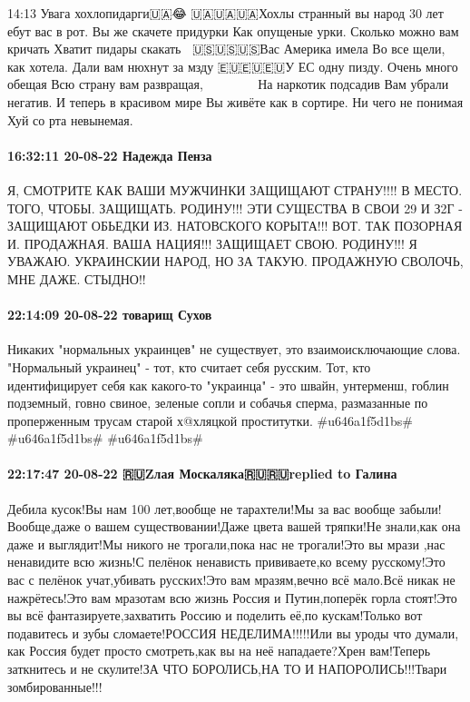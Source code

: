 14:13
Увага хохлопидарги🇺🇦😂
🇺🇦🇺🇦🇺🇦Хохлы странный вы народ
30 лет ебут вас в рот.
Вы же скачете придурки
Как опущеные урки.
Сколько можно вам кричать
Хватит пидары скакать🏳‍🌈
🇺🇸🇺🇸🇺🇸Вас Америка имела
Во все щели, как хотела.
Дали вам нюхнут за мзду
🇪🇺🇪🇺🇪🇺У ЕС одну пизду.
Очень много обещая
Всю страну вам развращая, 🏳‍🌈🇺🇦🏳‍🌈🇺🇦🇺🇸🏳‍🌈😂
На наркотик подсадив
Вам убрали негатив.
И теперь в красивом мире
Вы живёте как в сортире.
Ни чего не понимая
Хуй со рта невынемая.
🏳‍🌈🇺🇦🇺🇸🏳‍🌈🇺🇦🏳‍🌈🇺🇸😂😂😂

\paragraph{16:32:11 20-08-22 Надежда Пенза}

Я, СМОТРИТЕ КАК ВАШИ МУЖЧИНКИ ЗАЩИЩАЮТ СТРАНУ!!!!
В МЕСТО. ТОГО, ЧТОБЫ. ЗАЩИЩАТЬ. РОДИНУ!!!
ЭТИ СУЩЕСТВА В СВОИ 29 И З2Г - ЗАЩИЩАЮТ ОБЬЕДКИ
ИЗ. НАТОВСКОГО КОРЫТА!!!
ВОТ. ТАК ПОЗОРНАЯ И. ПРОДАЖНАЯ. ВАША НАЦИЯ!!!
ЗАЩИЩАЕТ СВОЮ. РОДИНУ!!!
Я УВАЖАЮ. УКРАИНСКИИ НАРОД, НО ЗА ТАКУЮ. ПРОДАЖНУЮ СВОЛОЧЬ, МНЕ ДАЖЕ. СТЫДНО!!

\paragraph{22:14:09 20-08-22 товарищ Сухов}

Никаких "нормальных украинцев" не существует, это взаимоисключающие слова.
"Нормальный украинец" - тот, кто считает себя русским. Тот, кто идентифицирует
себя как какого-то "украинца" - это швайн, унтерменш, гоблин подземный, говно
свиное, зеленые сопли и собачья сперма, размазанные по проперженным трусам
старой х@хляцкой проститутки. #u646a1f5d1bs# #u646a1f5d1bs# #u646a1f5d1bs#

\paragraph{22:17:47 20-08-22 🇷🇺Zлая Москаляка🇷🇺🇷🇺replied to Галина}

Дебила кусок!Вы нам 100 лет,вообще не тарахтели!Мы за вас вообще
забыли!Вообще,даже о вашем существовании!Даже цвета вашей тряпки!Не знали,как
она даже и выглядит!Мы никого не трогали,пока нас не трогали!Это вы мрази ,нас
ненавидите всю жизнь!С пелёнок ненависть прививаете,ко всему русскому!Это вас с
пелёнок учат,убивать русских!Это вам мразям,вечно всё мало.Всё никак не
нажрётесь!Это вам мразотам всю жизнь Россия и Путин,поперёк горла стоят!Это вы
всё фантазируете,захватить Россию и поделить её,по кускам!Только вот подавитесь
и зубы сломаете!РОССИЯ НЕДЕЛИМА!!!!!Или вы уроды что думали, как Россия будет
просто смотреть,как вы на неё нападаете?Хрен вам!Теперь заткнитесь и не
скулите!ЗА ЧТО БОРОЛИСЬ,НА ТО И НАПОРОЛИСЬ!!!Твари зомбированные!!!

